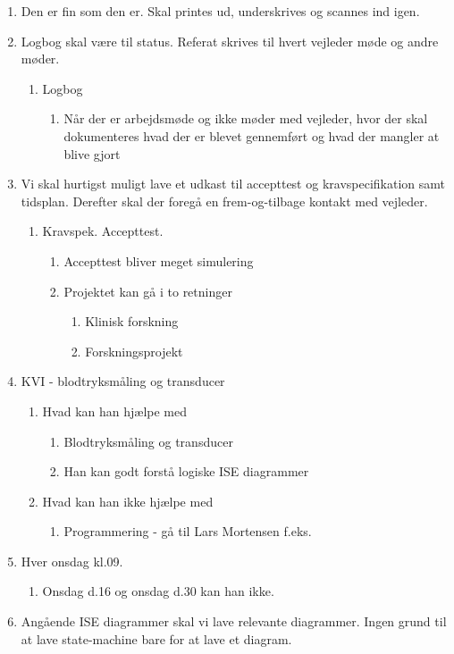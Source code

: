\begin{enumerate}
\item Den er fin som den er. Skal printes ud, underskrives og scannes ind igen.
\item Logbog skal være til status. Referat skrives til hvert vejleder møde og andre møder.
\begin{enumerate}
\item Logbog
\begin{enumerate}
\item Når der er arbejdsmøde og ikke møder med vejleder, hvor der skal dokumenteres hvad der er blevet gennemført og hvad der mangler at blive gjort 
\end{enumerate}
\end{enumerate}
\item Vi skal hurtigst muligt lave et udkast til accepttest og kravspecifikation samt tidsplan. Derefter skal der foregå en frem-og-tilbage kontakt med vejleder.
\begin{enumerate}
\item Kravspek. Accepttest.
\begin{enumerate}
\item Accepttest bliver meget simulering
\item Projektet kan gå i to retninger
\begin{enumerate}
\item Klinisk forskning
\item Forskningsprojekt
\end{enumerate}
\end{enumerate}
\end{enumerate}
\item KVI - blodtryksmåling og transducer
\begin{enumerate}
\item Hvad kan han hjælpe med
\begin{enumerate}
\item Blodtryksmåling og transducer
\item Han kan godt forstå logiske ISE diagrammer
\end{enumerate}
\item Hvad kan han ikke hjælpe med
\begin{enumerate}
\item Programmering - gå til Lars Mortensen f.eks.
\end{enumerate}
\end{enumerate}
\item Hver onsdag kl.09.
\begin{enumerate}
\item Onsdag d.16 og onsdag d.30 kan han ikke.
\end{enumerate}
\item Angående ISE diagrammer skal vi lave relevante diagrammer. Ingen grund til at lave state-machine bare for at lave et diagram.
\end{enumerate}



